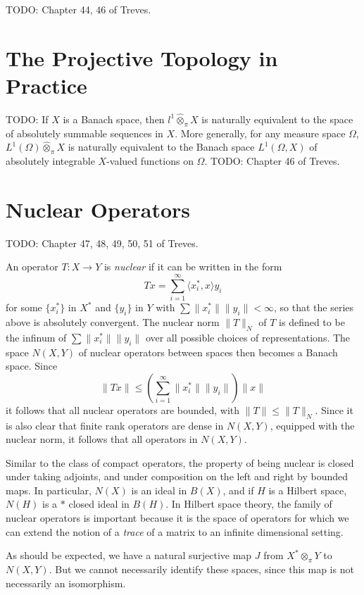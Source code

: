  TODO: Chapter 44, 46 of Treves.

 \section{The Projective Topology in Practice}

 TODO: If $X$ is a Banach space, then $l^1 \widehat{\otimes}_\pi X$ is naturally equivalent to the space of absolutely summable sequences in $X$. More generally, for any measure space $\Omega$, $L^1(\Omega) \widehat{\otimes}_\pi X$ is naturally equivalent to the Banach space $L^1(\Omega,X)$ of absolutely integrable $X$-valued functions on $\Omega$. TODO: Chapter 46 of Treves.

\section{Nuclear Operators}

TODO: Chapter 47, 48, 49, 50, 51 of Treves.

An operator $T: X \to Y$ is \emph{nuclear} if it can be written in the form
%
\[ Tx = \sum_{i = 1}^\infty \langle x_i^*, x \rangle y_i \]
%
for some $\{ x_i^* \}$ in $X^*$ and $\{ y_i \}$ in $Y$ with $\sum \| x_i^* \| \| y_i \| < \infty$, so that the series above is absolutely convergent. The nuclear norm $\| T \|_N$ of $T$ is defined to be the infinum of $\sum \| x_i^* \| \| y_i \|$ over all possible choices of representations. The space $N(X,Y)$ of nuclear operators between spaces then becomes a Banach space. Since
%
\[ \| Tx \| \leq \left( \sum_{i = 1}^\infty \| x_i^* \| \| y_i \| \right) \| x \| \]
%
it follows that all nuclear operators are bounded, with $\| T \| \leq \| T \|_N$. Since it is also clear that finite rank operators are dense in $N(X,Y)$, equipped with the nuclear norm, it follows that all operators in $N(X,Y)$.

Similar to the class of compact operators, the property of being nuclear is closed under taking adjoints, and under composition on the left and right by bounded maps. In particular, $N(X)$ is an ideal in $B(X)$, and if $H$ is a Hilbert space, $N(H)$ is a $*$ closed ideal in $B(H)$. In Hilbert space theory, the family of nuclear operators is important because it is the space of operators for which we can extend the notion of a \emph{trace} of a matrix to an infinite dimensional setting.

As should be expected, we have a natural surjective map $J$ from $X^* \otimes_\pi Y$ to $N(X,Y)$. But we cannot necessarily identify these spaces, since this map is not necessarily an isomorphism.


